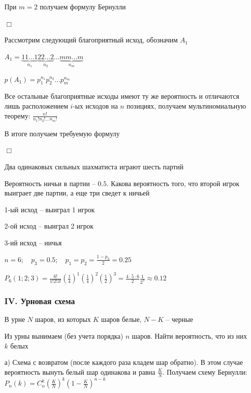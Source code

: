 \documentclass[12pt]{article}
\begin{document}
    При $m = 2$ получаем формулу Бернулли

    \begin{MyProof}
        $\Box$

        Рассмотрим следующий благоприятный исход, обозначим $A_1$

        $A_1 = \underset{n_1}{\underbrace{11\dots1}}\underset{n_2}{\underbrace{22\dots2}}\dots\underset{n_m}{\underbrace{mm\dots m}}$

        $p(A_1) = p_1^{n_1} p_2^{n_2} \dots p_m^{n_m}$

        Все остальные благоприятные исходы имеют ту же вероятность и отличаются лишь расположением $i$-ых исходов на $n$ позициях,
        получаем мультиномиальную теорему: $\frac{n!}{n_1! n_2! \dots n_m!}$

        В итоге получаем требуемую формулу

        $\Box$
    \end{MyProof}

    \Ex Два одинаковых сильных шахматиста играют шесть партий

    Вероятность ничьи в партии -- $0.5$. Какова вероятность того, что второй игрок выиграет две партии, а еще три сведет к ничьей

    1-ый исход -- выиграл 1 игрок

    2-ой исход -- выиграл 2 игрок

    3-ий исход -- ничья

    $n = 6; \quad p_3 = 0.5; \quad p_1 = p_2 = \frac{1 - p_3}{2} = 0.25$

    $P_6(1; 2; 3) = \frac{6!}{1!2!3!} \left(\frac{1}{4}\right)^1 \left(\frac{1}{4}\right)^2 \left(\frac{1}{2}\right)^3 = \frac{4 \cdot 5 \cdot 6}{2} \frac{1}{2^9} \approx 0.12$

    \hypertarget{urnschema}{}

    \subsubsection{IV. Урновая схема}

    В урне $N$ шаров, из которых $K$ шаров белые, $N - K$ -- черные

    Из урны вынимаем (без учета порядка) $n$ шаров. Найти вероятность, что из них $k$ белых

    а) Схема с возвратом (после каждого раза кладем шар обратно). В этом случае вероятность вынуть белый шар одинакова и
    равна $\frac{K}{N}$. Получаем схему Бернулли: $P_n(k) = C^k_n \left(\frac{K}{N}\right)^k \left(1 - \frac{K}{N}\right)^{n - k}$
\end{document}
